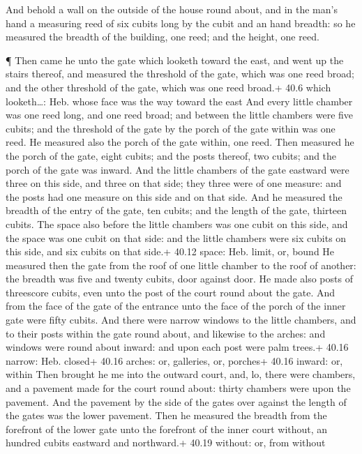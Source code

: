  And behold a wall on the outside of the house round about,
and in the man's hand a measuring reed of six cubits long by the cubit
and an hand breadth: so he measured the breadth of the building, one
reed; and the height, one reed.

 ¶ Then came he unto the gate which looketh toward the east,
and went up the stairs thereof, and measured the threshold of the gate,
which was one reed broad; and the other threshold of the gate, which was
one reed broad.+ 40.6 which looketh\ldots: Heb. whose face was the way
toward the east  And every little chamber was one reed long,
and one reed broad; and between the little chambers were five cubits;
and the threshold of the gate by the porch of the gate within was one
reed.  He measured also the porch of the gate within, one
reed.  Then measured he the porch of the gate, eight cubits;
and the posts thereof, two cubits; and the porch of the gate was inward.
 And the little chambers of the gate eastward were three on
this side, and three on that side; they three were of one measure: and
the posts had one measure on this side and on that side. 
And he measured the breadth of the entry of the gate, ten cubits; and
the length of the gate, thirteen cubits.  The space also
before the little chambers was one cubit on this side, and the space was
one cubit on that side: and the little chambers were six cubits on this
side, and six cubits on that side.+ 40.12 space: Heb. limit, or, bound
 He measured then the gate from the roof of one little
chamber to the roof of another: the breadth was five and twenty cubits,
door against door.  He made also posts of threescore
cubits, even unto the post of the court round about the gate.
 And from the face of the gate of the entrance unto the
face of the porch of the inner gate were fifty cubits.  And
there were narrow windows to the little chambers, and to their posts
within the gate round about, and likewise to the arches: and windows
were round about inward: and upon each post were palm trees.+ 40.16
narrow: Heb. closed+ 40.16 arches: or, galleries, or, porches+ 40.16
inward: or, within  Then brought he me into the outward
court, and, lo, there were chambers, and a pavement made for the court
round about: thirty chambers were upon the pavement.  And
the pavement by the side of the gates over against the length of the
gates was the lower pavement.  Then he measured the breadth
from the forefront of the lower gate unto the forefront of the inner
court without, an hundred cubits eastward and northward.+ 40.19 without:
or, from without

